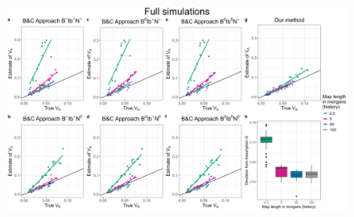 \documentclass[12pt]{article}
\providecommand{\DIFaddbeginFL}{} %
\providecommand{\DIFaddendFL}{} %
\providecommand{\DIFdelbeginFL}{} %
\providecommand{\DIFdelendFL}{} %
\newcommand{\DIFscaledelfig}{0.5}
\newlength{\DIFdelgraphicswidth} %
\newlength{\DIFdelgraphicsheight} %
\newcommand{\DIFaddincludegraphics}[2][]{{\color{blue}\fbox{\DIFOincludegraphics[#1]{#2}}}} %
\newcommand{\DIFdelincludegraphics}[2][]{%
\sbox{\DIFdelgraphicsbox}{\DIFOincludegraphics[#1]{#2}}%
\settoboxwidth{\DIFdelgraphicswidth}{\DIFdelgraphicsbox} %
\settoboxtotalheight{\DIFdelgraphicsheight}{\DIFdelgraphicsbox} %
\scalebox{\DIFscaledelfig}{%
\parbox[b]{\DIFdelgraphicswidth}{\usebox{\DIFdelgraphicsbox}\\[-\baselineskip] \rule{\DIFdelgraphicswidth}{0em}}\llap{\resizebox{\DIFdelgraphicswidth}{\DIFdelgraphicsheight}{%
\setlength{\unitlength}{\DIFdelgraphicswidth}%
\begin{picture}(1,1)%
\thicklines\linethickness{2pt} %
{\color[rgb]{1,0,0}\put(0,0){\framebox(1,1){}}}%
{\color[rgb]{1,0,0}\put(0,0){\line( 1,1){1}}}%
{\color[rgb]{1,0,0}\put(0,1){\line(1,-1){1}}}%
\end{picture}%
}\hspace*{3pt}}} %
} %
\DeclareRobustCommand{\DIFaddbeginFL}{\DIFOaddbeginFL \let\includegraphics\DIFaddincludegraphics} %
\DeclareRobustCommand{\DIFaddendFL}{\DIFOaddendFL \let\includegraphics\DIFOincludegraphics} %
\DeclareRobustCommand{\DIFdelbeginFL}{\DIFOdelbeginFL \let\includegraphics\DIFdelincludegraphics} %
\DeclareRobustCommand{\DIFdelendFL}{\DIFOaddendFL \let\includegraphics\DIFOincludegraphics} %
\begin{document}
\begin{bibunit}
\begin{landscape}
\begin{figure}[H]
\begin{center}
\DIFdelbeginFL %
\DIFdelendFL \DIFaddbeginFL \includegraphics[scale = 0.14]{Figures/BC_full.jpg}
\DIFaddendFL \end{center}

\end{figure}
\end{landscape}
\end{bibunit}
\end{document}
